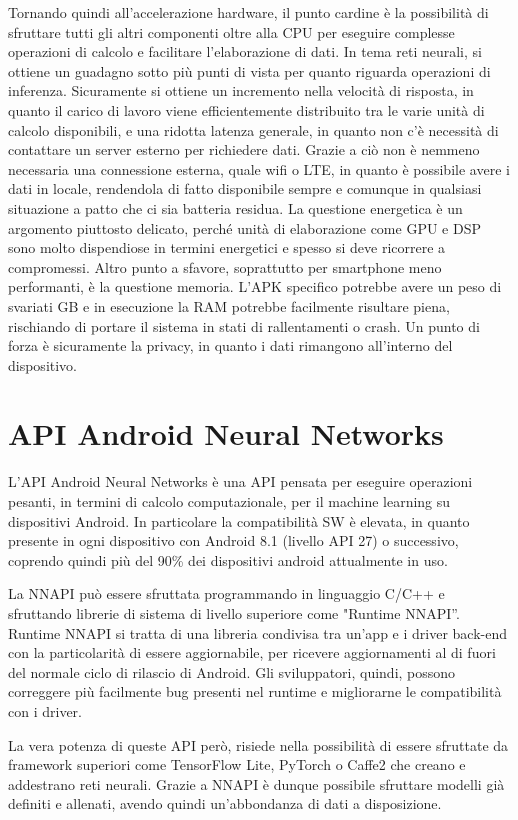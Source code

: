 Tornando quindi all’accelerazione hardware, il punto cardine è la possibilità di sfruttare tutti gli altri componenti oltre alla CPU per eseguire complesse
operazioni di calcolo e facilitare l’elaborazione di dati. 
In tema reti neurali, si ottiene un guadagno sotto più punti di vista per quanto riguarda operazioni di inferenza. Sicuramente si ottiene un incremento
nella velocità di risposta, in quanto il carico di lavoro viene efficientemente distribuito tra le varie unità di calcolo disponibili, e una ridotta
latenza generale, in quanto non c’è necessità di contattare un server esterno per richiedere dati.
Grazie a ciò non è nemmeno necessaria una connessione esterna, quale wifi o LTE, in quanto è possibile avere i dati in locale, rendendola di fatto
disponibile sempre e comunque in qualsiasi situazione a patto che ci sia batteria residua.
La questione energetica è un argomento piuttosto delicato, perché unità di elaborazione come GPU e DSP sono molto dispendiose in termini energetici e
spesso si deve ricorrere a compromessi.
Altro punto a sfavore, soprattutto per smartphone meno performanti, è la questione memoria. L’APK specifico potrebbe avere un peso di svariati GB e in
esecuzione la RAM potrebbe facilmente risultare piena, rischiando di portare il sistema in stati di rallentamenti o crash.
Un punto di forza è sicuramente la privacy, in quanto i dati rimangono all’interno del dispositivo.

\section{API Android Neural Networks}
L’API Android Neural Networks è una API pensata per eseguire operazioni pesanti, in termini di calcolo computazionale, per il machine learning su
dispositivi Android. In particolare la compatibilità SW è elevata, in quanto presente in ogni dispositivo con Android 8.1 (livello API 27) o successivo,
coprendo quindi più del 90\% dei dispositivi android attualmente in uso.

La NNAPI può essere sfruttata programmando in linguaggio C/C++ e sfruttando librerie di sistema di livello superiore come "Runtime NNAPI”.
Runtime NNAPI si tratta di una libreria condivisa tra un’app e i driver back-end con la particolarità di essere aggiornabile, per ricevere aggiornamenti
al di fuori del normale ciclo di rilascio di Android. Gli sviluppatori, quindi, possono correggere più facilmente bug presenti nel runtime e migliorarne
le compatibilità con i driver.

La vera potenza di queste API però, risiede nella possibilità di essere sfruttate da framework superiori come TensorFlow Lite, PyTorch o Caffe2 che
creano e addestrano reti neurali. Grazie a NNAPI è dunque possibile sfruttare modelli già definiti e allenati, avendo quindi un’abbondanza di dati a
disposizione.

